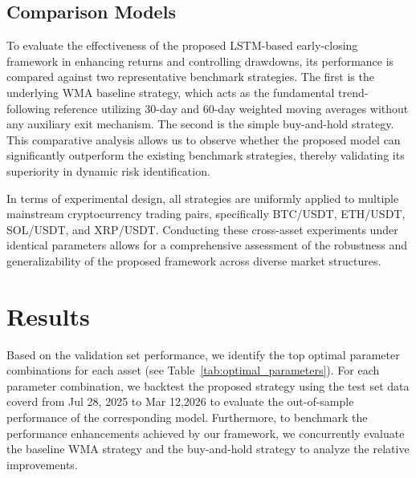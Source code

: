 \documentclass[12pt]{article}
\begin{document}
\subsection{Comparison Models}\label{subsec:comparison_models}

To evaluate the effectiveness of the proposed LSTM-based early-closing framework in enhancing returns and controlling drawdowns, its performance is compared against two representative benchmark strategies. The first is the underlying WMA baseline strategy, which acts as the fundamental trend-following reference utilizing 30-day and 60-day weighted moving averages without any auxiliary exit mechanism. The second is the simple buy-and-hold strategy. This comparative analysis allows us to observe whether the proposed model can significantly outperform the existing benchmark strategies, thereby validating its superiority in dynamic risk identification.

In terms of experimental design, all strategies are uniformly applied to multiple mainstream cryptocurrency trading pairs, specifically BTC/USDT, ETH/USDT, SOL/USDT, and XRP/USDT. Conducting these cross-asset experiments under identical parameters allows for a comprehensive assessment of the robustness and generalizability of the proposed framework across diverse market structures.

\section{Results}\label{sec:results}

Based on the validation set performance, we identify the top optimal parameter combinations for each asset (see Table~\ref{tab:optimal_parameters}). For each parameter combination, we backtest the proposed strategy using the test set data coverd from Jul 28, 2025 to Mar 12,2026 to evaluate the out-of-sample performance of the corresponding model. Furthermore, to benchmark the performance enhancements achieved by our framework, we concurrently evaluate the baseline WMA strategy and the buy-and-hold strategy to analyze the relative improvements.
\end{document}
